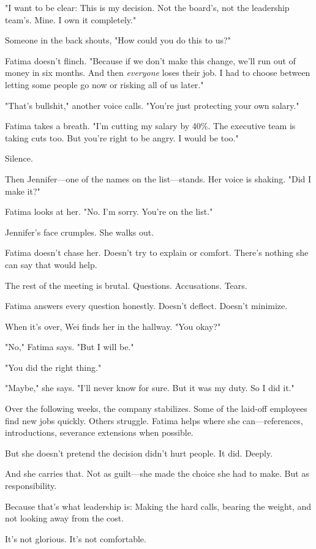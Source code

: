 \documentclass[11pt,twoside]{book}
\begin{document}
"I want to be clear: This is my decision. Not the board's, not the leadership team's. Mine. I own it completely."

Someone in the back shouts, "How could you do this to us?"

Fatima doesn't flinch. "Because if we don't make this change, we'll run out of money in six months. And then \emph{everyone} loses their job. I had to choose between letting some people go now or risking all of us later."

"That's bullshit," another voice calls. "You're just protecting your own salary."

Fatima takes a breath. "I'm cutting my salary by 40\%. The executive team is taking cuts too. But you're right to be angry. I would be too."

Silence.

Then Jennifer—one of the names on the list—stands. Her voice is shaking. "Did I make it?"

Fatima looks at her. "No. I'm sorry. You're on the list."

Jennifer's face crumples. She walks out.

Fatima doesn't chase her. Doesn't try to explain or comfort. There's nothing she can say that would help.

The rest of the meeting is brutal. Questions. Accusations. Tears.

Fatima answers every question honestly. Doesn't deflect. Doesn't minimize.

When it's over, Wei finds her in the hallway. "You okay?"

"No," Fatima says. "But I will be."

"You did the right thing."

"Maybe," she says. "I'll never know for sure. But it was my duty. So I did it."

Over the following weeks, the company stabilizes. Some of the laid-off employees find new jobs quickly. Others struggle. Fatima helps where she can—references, introductions, severance extensions when possible.

But she doesn't pretend the decision didn't hurt people. It did. Deeply.

And she carries that. Not as guilt—she made the choice she had to make. But as responsibility.

Because that's what leadership is: Making the hard calls, bearing the weight, and not looking away from the cost.

It's not glorious. It's not comfortable.
\end{document}
